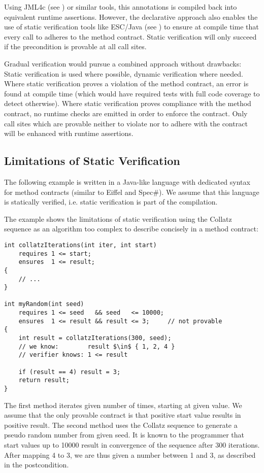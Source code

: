 Using JML4c (see \cite{sarcar2010new}) or similar tools, this annotations is compiled back into equivalent runtime assertions.
However, the declarative approach also enables the use of static verification tools like ESC/Java (see \cite{leino2000esc}) to ensure at compile time that every call to  adheres to the method contract.
Static verification will only succeed if the precondition is provable at all call sites.

Gradual verification would pursue a combined approach without drawbacks:
Static verification is used where possible, dynamic verification where needed.
Where static verification proves a violation of the method contract, an error is found at compile time (which would have required tests with full code coverage to detect otherwise).
Where static verification proves compliance with the method contract, no runtime checks are emitted in order to enforce the contract.
Only call sites which are provable neither to violate nor to adhere with the contract will be enhanced with runtime assertions.



\subsection{Limitations of Static Verification}
\label{ssec:limitations-of-static}
The following example is written in a Java-like language with dedicated syntax for method contracts (similar to Eiffel and Spec\#).
We assume that this language is statically verified, i.e. static verification is part of the compilation.

The example shows the limitations of static verification using the Collatz sequence as an algorithm too complex to describe concisely in a method contract:
\begin{lstlisting}
int collatzIterations(int iter, int start)
    requires 1 <= start;
    ensures  1 <= result;
{
    // ...
}

int myRandom(int seed)
    requires 1 <= seed   && seed   <= 10000;
    ensures  1 <= result && result <= 3;     // not provable
{
    int result = collatzIterations(300, seed);
    // we know:        result $\in$ { 1, 2, 4 }
    // verifier knows: 1 <= result
    
    if (result == 4) result = 3;
    return result;
}
\end{lstlisting}
The first method  iterates given number of times, starting at given value.
We assume that the only provable contract is that positive start value results in positive result.
The second method  uses the Collatz sequence to generate a pseudo random number from given seed.
It is known to the programmer that start values up to 10000 result in convergence of the sequence after 300 iterations.
After mapping 4 to 3, we are thus given a number between 1 and 3, as described in the postcondition.

